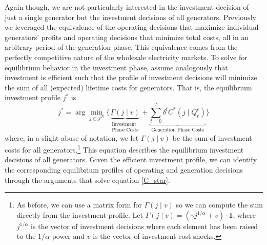 Again though, we are not particularly interested in the investment decision of just a single generator but the investment decisions of all generators. Previously we leveraged the equivalence of the operating decisions that maximize individual generators' profits and operating decisions that minimize total costs, all in an arbitrary period of the generation phase. This equivalence comes from the perfectly competitive nature of the wholesale electricity markets. To solve for equilibrium behavior in the investment phase, assume analogously that investment is efficient such that the profile of investment decisions will minimize the sum of all (expected) lifetime costs for generators. That is, the equilibrium investment profile $j^*$ is
\begin{equation}
    j^* = \arg\min_{j \in \mathcal{J}^N} \biggl\{ 
    \underbrace{\Gamma (j \mid v)}_{\substack{\text{Investment}\\ \text{Phase Costs}}} + \underbrace{\sum_{t=0}^T \delta^t C^*(j\mid Q_t^e)}_{\text{Generation Phase Costs}}  \biggr\}
\end{equation}
where, in a slight abuse of notation, we let $\Gamma (j\mid v)$ be the sum of investment costs for all generators.\footnote{
    As before, we can use a matrix form for $\Gamma (j\mid v)$ so we can compute the sum directly from the investment profile. Let $\Gamma(j\mid v) = \left(\gamma j^{1/\alpha} + v\right)\cdot \textbf{1}$, where $j^{1/\alpha}$ is the vector of investment decisions where each element has been raised to the $1/\alpha$ power and $v$ is the vector of investment cost shocks.
} This equation describes the equilibrium investment decisions of all generators. Given the efficient investment profile, we can identify the corresponding equilibrium profiles of operating and generation decisions through the arguments that solve equation \eqref{C_star}.






